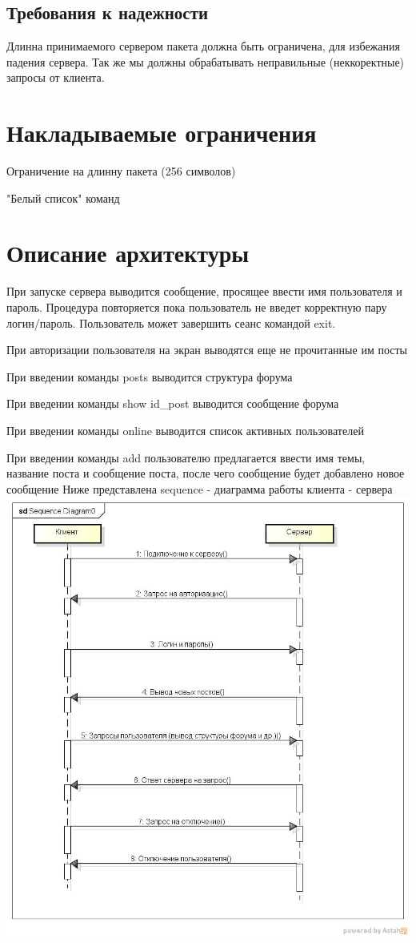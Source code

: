 \documentclass[10pt,a4paper]{report}
\begin{document}
\section{Требования к надежности}
Длинна принимаемого сервером пакета должна быть ограничена, для избежания падения сервера. Так же мы должны обрабатывать неправильные (неккоректные) запросы от клиента.
\chapter{Накладываемые ограничения}
\item Ограничение на длинну пакета (256 символов)
\item "Белый список" команд
\chapter{Описание архитектуры}
\item При запуске сервера выводится сообщение, просящее ввести имя пользователя и пароль. Процедура повторяется пока пользователь не введет корректную пару логин/пароль. Пользователь может завершить сеанс командой exit.
\item При авторизации пользователя на экран выводятся еще не прочитанные им посты
\item При введении команды posts выводится структура форума
\item При введении команды show id_post выводится сообщение форума
\item При введении команды online выводится список активных пользователей
\item При введении команды add пользователю предлагается ввести имя темы, название поста и сообщение поста, после чего сообщение будет добавлено новое сообщение
Ниже представлена sequence - диаграмма работы клиента - сервера
\includegraphics[scale=0.9]{diagram}
\end{document}
